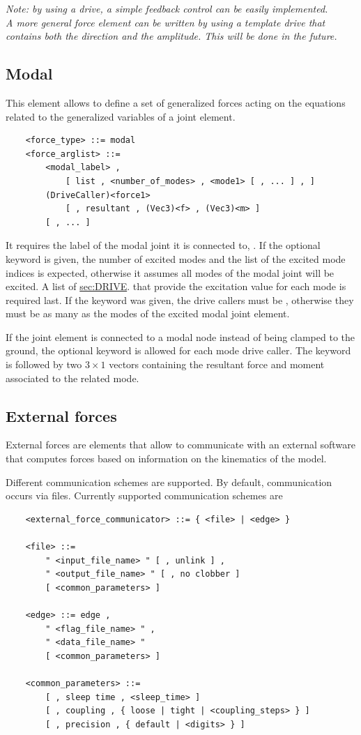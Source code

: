 \noindent
{\em 
Note: by using a  drive, a simple feedback control can be easily
implemented. \\
A more general force element can be written by using a template drive
that contains both the direction and the amplitude. This will be done in the
future. 
}

\subsection{Modal}
This element allows to define a set of generalized forces
acting on the equations related to the generalized variables
of a  joint element.
\begin{verbatim}
    <force_type> ::= modal
    <force_arglist> ::=
        <modal_label> ,
            [ list , <number_of_modes> , <mode1> [ , ... ] , ]
        (DriveCaller)<force1>
            [ , resultant , (Vec3)<f> , (Vec3)<m> ]
        [ , ... ]
\end{verbatim}
It requires the label of the modal joint it is connected to,
.
If the optional keyword  is given, the number of excited modes
 and the list of the excited mode indices
is expected, otherwise it assumes all modes of the 
modal joint will be excited.
A list of
\hyperref{\kw{drive callers}}{\kw{drive callers} (see Section~}{)}{sec:DRIVE}.
that provide the excitation value for each mode is required last.
If the keyword  was given, the drive callers
must be , otherwise they must be as many
as the modes of the excited modal joint element.

If the  joint element is connected to a modal node
instead of being clamped to the ground, the optional keyword 
is allowed for each mode drive caller.
The keyword  is followed by two $3\times 1$ vectors
containing the resultant force and moment associated to the related mode.

\subsection{External forces}
External forces are elements that allow to communicate
with an external software that computes forces
based on information on the kinematics of the model.

Different communication schemes are supported.
By default, communication occurs via files.
Currently supported communication schemes are
\begin{verbatim}
    <external_force_communicator> ::= { <file> | <edge> }

    <file> ::=
        " <input_file_name> " [ , unlink ] ,
        " <output_file_name> " [ , no clobber ]
        [ <common_parameters> ]

    <edge> ::= edge ,
        " <flag_file_name> " ,
        " <data_file_name> "
        [ <common_parameters> ]

    <common_parameters> ::=
        [ , sleep time , <sleep_time> ]
        [ , coupling , { loose | tight | <coupling_steps> } ]
        [ , precision , { default | <digits> } ]
\end{verbatim}

